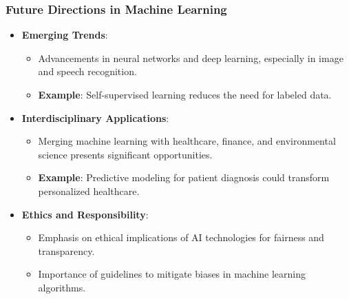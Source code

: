 \documentclass[aspectratio=169]{beamer}
\begin{document}
\begin{frame}[fragile]
    \frametitle{Future Directions in Machine Learning}
    \begin{itemize}
        \item \textbf{Emerging Trends}:
        \begin{itemize}
            \item Advancements in neural networks and deep learning, especially in image and speech recognition.
            \item \textbf{Example}: Self-supervised learning reduces the need for labeled data.
        \end{itemize}

        \item \textbf{Interdisciplinary Applications}:
        \begin{itemize}
            \item Merging machine learning with healthcare, finance, and environmental science presents significant opportunities.
            \item \textbf{Example}: Predictive modeling for patient diagnosis could transform personalized healthcare.
        \end{itemize}

        \item \textbf{Ethics and Responsibility}:
        \begin{itemize}
            \item Emphasis on ethical implications of AI technologies for fairness and transparency.
            \item Importance of guidelines to mitigate biases in machine learning algorithms.
        \end{itemize}
    \end{itemize}
\end{frame}
\end{document}
